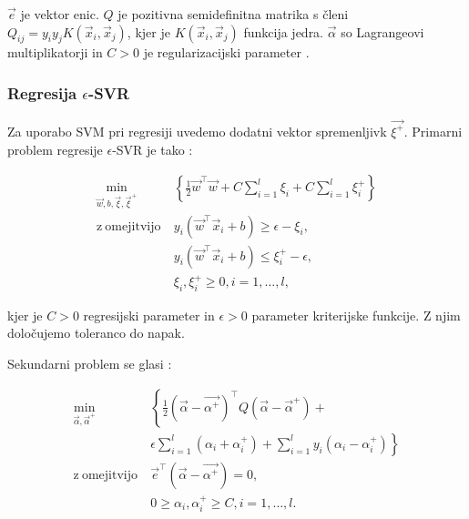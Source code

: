 {$\vec{e}$ je vektor enic. $Q$ je pozitivna semidefinitna matrika s členi $Q_{ij} = y_i y_jK(\vec{x}_i,\vec{x}_j)$, kjer je $K(\vec{x}_i,\vec{x}_j)$ funkcija jedra. $\vec{\alpha}$ so Lagrangeovi multiplikatorji in $C>0$ je regularizacijski parameter \cite{chang2011a}.








\subsubsection{Regresija \texorpdfstring{$\epsilon$}{e}-SVR}

Za uporabo SVM pri regresiji uvedemo dodatni vektor spremenljivk $\vec{\xi^+}$. Primarni problem regresije $\epsilon$-SVR je  tako \cite{chang2011a}:

\begin{equation}\label{eq:e-svr-primal}
\begin{aligned}
\min_{\vec{w}, b, \vec{\xi}, \vec{\xi}^+} &~ \left\{ \frac{1}{2} \vec{w}^\top\vec{w} + C \sum_{i=1}^l\xi_i + C \sum_{i=1}^l\xi_i^+ \right\}\\
    \mathrm{z~omejitvijo} &~ y_i \left( \vec{w}^\top \vec{x}_i + b \right) \geq \epsilon - \xi_i,\\
    &~  y_i \left( \vec{w}^\top \vec{x}_i + b \right) \leq \xi_i^+ - \epsilon, \\
    &~  \xi_i,\xi_i^+ \geq 0, i=1, \ldots, l,
\end{aligned}	
\end{equation}

kjer je $C>0$ regresijski parameter in $\epsilon > 0$ parameter kriterijske funkcije. Z njim določujemo toleranco do napak.

Sekundarni problem se glasi \cite{chang2011a}:

\begin{equation}\label{eq:e-svr-dual}
\begin{aligned}
\min_{\vec{\alpha}, \vec{\alpha}^+} &~ \left\{ \frac{1}{2} (\vec{\alpha} - \vec{\alpha^ +})^\top Q (\vec{\alpha} - \vec{\alpha}^+) +\right. \\
&~ \left.\epsilon \sum_{i=1}^l\left( \alpha_i + \alpha_i^+ \right) + \sum_{i=1}^l y_i\left( \alpha_i - \alpha_i^+ \right) \right\}\\
    \mathrm{z~omejitvijo} &~ 
    \vec{e}^\top \left(\vec{\alpha} - \vec{\alpha^+} \right) = 0,\\
    &~ 0 \geq \alpha_i, \alpha_i^+ \geq C, i=1, \ldots, l.
\end{aligned}	
\end{equation}

}
